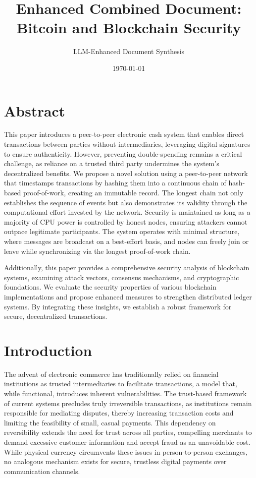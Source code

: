 \documentclass{article}
\title{Enhanced Combined Document: Bitcoin and Blockchain Security}
\author{LLM-Enhanced Document Synthesis}
\date{\today}
\begin{document}
\maketitle

\section{Abstract}
This paper introduces a peer-to-peer electronic cash system that enables direct transactions between parties without intermediaries, leveraging digital signatures to ensure authenticity. However, preventing double-spending remains a critical challenge, as reliance on a trusted third party undermines the system's decentralized benefits. We propose a novel solution using a peer-to-peer network that timestamps transactions by hashing them into a continuous chain of hash-based proof-of-work, creating an immutable record. The longest chain not only establishes the sequence of events but also demonstrates its validity through the computational effort invested by the network. Security is maintained as long as a majority of CPU power is controlled by honest nodes, ensuring attackers cannot outpace legitimate participants. The system operates with minimal structure, where messages are broadcast on a best-effort basis, and nodes can freely join or leave while synchronizing via the longest proof-of-work chain.

Additionally, this paper provides a comprehensive security analysis of blockchain systems, examining attack vectors, consensus mechanisms, and cryptographic foundations. We evaluate the security properties of various blockchain implementations and propose enhanced measures to strengthen distributed ledger systems. By integrating these insights, we establish a robust framework for secure, decentralized transactions.

\section{Introduction}
The advent of electronic commerce has traditionally relied on financial institutions as trusted intermediaries to facilitate transactions, a model that, while functional, introduces inherent vulnerabilities. The trust-based framework of current systems precludes truly irreversible transactions, as institutions remain responsible for mediating disputes, thereby increasing transaction costs and limiting the feasibility of small, casual payments. This dependency on reversibility extends the need for trust across all parties, compelling merchants to demand excessive customer information and accept fraud as an unavoidable cost. While physical currency circumvents these issues in person-to-person exchanges, no analogous mechanism exists for secure, trustless digital payments over communication channels.
\end{document}
